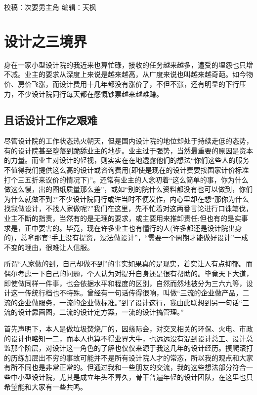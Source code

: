 \documentclass[]{book}
\begin{document}
校稿：次要男主角
编辑：天枫

\hypertarget{ux8bbeux8ba1ux4e4bux4e09ux5883ux754c}{%
\section{设计之三境界}\label{ux8bbeux8ba1ux4e4bux4e09ux5883ux754c}}

身在一家小型设计院的我近来也算忙碌，接收的任务越来越多，遭受的埋怨也只增不减。业主的要求从深度上来说是越来越高，从广度来说也叫越来越奇葩。如今物价、房价飞涨，而设计费用十几年都没有涨价了，不但不涨，还有明显的下行压力，不少设计院同行每天都在感慨钞票越来越难赚。

\hypertarget{ux4e14ux8bddux8bbeux8ba1ux5de5ux4f5cux4e4bux8270ux96be}{%
\subsection{且话设计工作之艰难}\label{ux4e14ux8bddux8bbeux8ba1ux5de5ux4f5cux4e4bux8270ux96be}}

尽管设计院的工作状态热火朝天，但是国内设计院的地位却处于持续走低的态势，有的设计院甚至堕落到跪舔业主的地步。业主过于强势，当然最重要的原因是资本的力量。而业主对设计的轻视，则实实在在地透露他们的想法``你们这些人的服务不值得我们提供这么高的设计或咨询费用(即使是现在的设计费要按国家计价标准打个三五折来议价的情况下)''。还常有业主的人念叨着``这么简单的事，你为什么做这么慢，出的图纸质量那么差''，或如``别的院什么资料都没有也可以做到，你们为什么就做不到?''不少设计院同行或许当时不便发作，内心里却在想``那你为什么找我做设计，不找人家做呢?''我们在这里，先不忙着对这两番言论进行口诛笔伐，业主不断的指责，当然有的是无理的要求，或主要用来推卸责任;但也有的是实事求是，正中要害的。毕竟，现在许多业主也有懂行的人(许多都还是设计院出身的)，总拿那套``手上没有提资，没法做设计''，``需要一个周期才能做好设计''一成不变的理由，很难让人信服。

所谓``人家做的到，自己却做不到''的事实如果真的是现实，着实让人有点抑郁。而偶尔考虑一下自己的问题，个人认为对提升自身还是很有帮助的。毕竟天下大道，即使做同样一件事，也会依据水平和程度的区别，自然而然地被分为三六九等，设计这一传统行档也不特殊。曾经有一句话传得很响，叫做``三流的企业做产品，二流的企业做服务，一流的企业做标准。''到了设计这行，我由此联想到另一句话``三流的设计靠画图，二流的设计定方案，一流的设计搞管理。''

首先声明下，本人是做垃圾焚烧厂的，因缘际会，对交叉相关的环保、火电、市政的设计也略知一二，而本人也算不得业界大牛，也远远没有混到设计总工、设计总监那个阶层，对设计这一角色的了解也仅仅来源于我这几年的设计经历。摸爬滚打的历练加层出不穷的事故可能并不是所有设计院人才的常态，所以我的观点和大家有所不同也是非常正常的。但通过我和一些朋友的交流，我的这些想法部分符合一些中小型设计院，尤其是成立年头不算久，骨干普遍年轻的设计团队，在这里也只希望能和大家有一些共鸣。
\end{document}
